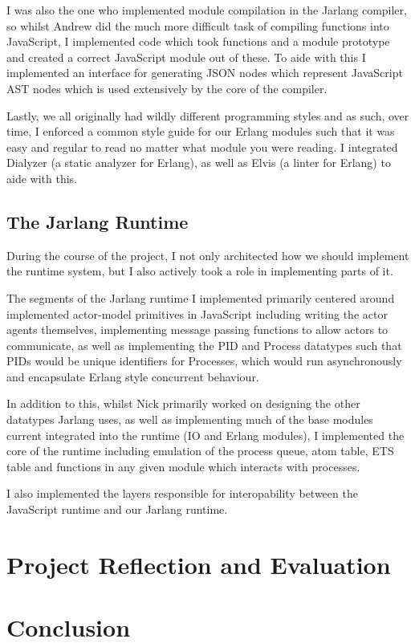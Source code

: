\documentclass[twoside,12pt,titlepage,a4paper]{article}
\newcommand\blankpage{%
    \null
    \thispagestyle{empty}%
    \addtocounter{page}{-1}%
    \newpage}
\begin{document}
		I was also the one who implemented module compilation in the Jarlang compiler, so whilst Andrew did the much more difficult
		task of compiling functions into JavaScript, I implemented code which took functions and a module prototype and created
		a correct JavaScript module out of these. To aide with this I implemented an interface for generating JSON nodes which represent 
		JavaScript AST nodes which is used extensively by the core of the compiler.

		Lastly, we all originally had wildly different programming styles and as such, over time, I enforced a common style guide
		for our Erlang modules such that it was easy and regular to read no matter what module you were reading. I integrated
		Dialyzer (a static analyzer for Erlang), as well as Elvis (a linter for Erlang) to aide with this.

	\subsection{The Jarlang Runtime}
		During the course of the project, I not only architected how we should implement the runtime system, but I also actively took
		a role in implementing parts of it.

		The segments of the Jarlang runtime I implemented primarily centered around implemented actor-model primitives in JavaScript including
		writing the actor agents themselves, implementing message passing functions to allow actors to communicate, as well as
		implementing the PID and Process datatypes such that PIDs would be unique identifiers for Processes, which would run asynchronously
		and encapsulate Erlang style concurrent behaviour.

		In addition to this, whilst Nick primarily worked on designing the other datatypes Jarlang uses, as well as implementing much of
		the base modules current integrated into the runtime (IO and Erlang modules), I implemented the core of the runtime including
		emulation of the process queue, atom table, ETS table and functions in any given module which interacts with processes.

		I also implemented the layers responsible for interopability between the JavaScript runtime and our Jarlang runtime.


\section{Project Reflection and Evaluation}
\label{Project Reflection and Evaluation}

\section{Conclusion}
\label{Conclusion}


%

\blankpage
\end{document}
